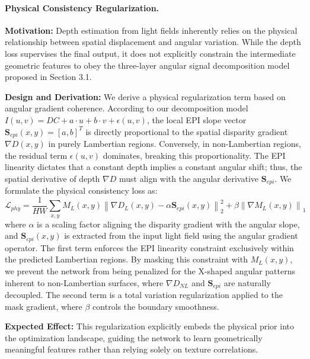 \documentclass[lettersize,journal]{IEEEtran}
\begin{document}
\paragraph{Physical Consistency Regularization.}
\textbf{Motivation:} Depth estimation from light fields inherently relies on the physical relationship between spatial displacement and angular variation. While the depth loss supervises the final output, it does not explicitly constrain the intermediate geometric features to obey the three-layer angular signal decomposition model proposed in Section 3.1.

\textbf{Design and Derivation:} We derive a physical regularization term based on angular gradient coherence. According to our decomposition model $I(u,v) = DC + a \cdot u + b \cdot v + \epsilon(u,v)$, the local EPI slope vector $\mathbf{S}_{epi}(x,y) = [a, b]^T$ is directly proportional to the spatial disparity gradient $\nabla D(x,y)$ in purely Lambertian regions. Conversely, in non-Lambertian regions, the residual term $\epsilon(u,v)$ dominates, breaking this proportionality. The EPI linearity dictates that a constant depth implies a constant angular shift; thus, the spatial derivative of depth $\nabla D$ must align with the angular derivative $\mathbf{S}_{epi}$. We formulate the physical consistency loss as:
\begin{equation}
\label{eq:eq26}
\mathcal{L}_{phy} = \frac{1}{HW} \sum_{x,y} M_{L}(x,y) \left\| \nabla D_{L}(x,y) - \alpha \mathbf{S}_{epi}(x,y) \right\|_2^2 + \beta \left\| \nabla M_{L}(x,y) \right\|_1
\end{equation}
where $\alpha$ is a scaling factor aligning the disparity gradient with the angular slope, and $\mathbf{S}_{epi}(x,y)$ is extracted from the input light field using the angular gradient operator. The first term enforces the EPI linearity constraint exclusively within the predicted Lambertian regions. By masking this constraint with $M_{L}(x,y)$, we prevent the network from being penalized for the X-shaped angular patterns inherent to non-Lambertian surfaces, where $\nabla D_{NL}$ and $\mathbf{S}_{epi}$ are naturally decoupled. The second term is a total variation regularization applied to the mask gradient, where $\beta$ controls the boundary smoothness.

\textbf{Expected Effect:} This regularization explicitly embeds the physical prior into the optimization landscape, guiding the network to learn geometrically meaningful features rather than relying solely on texture correlations.
\end{document}
